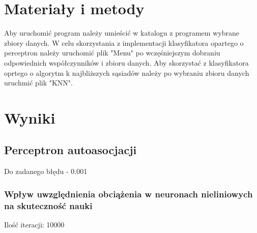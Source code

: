 \documentclass{classrep}
\begin{document}
	\section{Materiały i metody}
	{
		Aby uruchomić program należy umieścić w katalogu z programem wybrane zbiory danych.
		W celu skorzystania z implementacji klasyfikatora opartego o perceptron należy uruchomić plik "Menu" po wczęśniejszym dobraniu odpowiednich współczynników i zbioru danych.
		Aby skorzystać z klasyfikatora oprtego o algorytm k najbliższych sąsiadów należy po wybraniu zbioru danych uruchmić plik "KNN".
	}
\section{Wyniki}

\subsection{Perceptron autoasocjacji}
Do zadanego błędu - 0.001
\subsubsection{Wpływ uwzględnienia obciążenia w neuronach nieliniowych na skuteczność nauki}
Ilość iteracji:  10000

    
\end{document}
